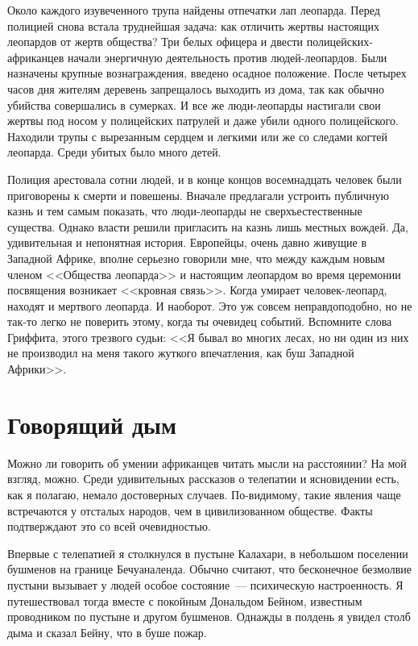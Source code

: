 \documentclass[12pt,a4paper,twoside,openany,svgnames]{memoir}
\begin{document}
Около каждого изувеченного трупа найдены отпечатки лап леопарда. Перед полицией снова встала труднейшая задача: как отличить жертвы настоящих леопардов от жертв общества? Три белых офицера и двести полицейских-африканцев начали энергичную деятельность против людей-леопардов. Были назначены крупные вознаграждения, введено осадное положение. После четырех часов дня жителям деревень запрещалось выходить из дома, так как обычно убийства совершались в сумерках. И все же люди-леопарды настигали свои жертвы под носом у полицейских патрулей и даже убили одного полицейского. Находили трупы с вырезанным сердцем и легкими или же со следами когтей леопарда. Среди убитых было много детей.

Полиция арестовала сотни людей, и в конце концов восемнадцать человек были приговорены к смерти и повешены. Вначале предлагали устроить публичную казнь и тем самым показать, что люди-леопарды не сверхъестественные существа. Однако власти решили пригласить на казнь лишь местных вождей. Да, удивительная и непонятная история. Европейцы, очень давно живущие в Западной Африке, вполне серьезно говорили мне, что между каждым новым членом <<Общества леопарда>> и настоящим леопардом во время церемонии посвящения возникает <<кровная связь>>. Когда умирает человек-леопард, находят и мертвого леопарда. И наоборот. Это уж совсем неправдоподобно, но не так-то легко не поверить этому, когда ты очевидец событий. Вспомните слова Гриффита, этого трезвого судьи: <<Я бывал во многих лесах, но ни один из них не производил на меня такого жуткого впечатления, как буш Западной Африки>>.

\chapter{Говорящий дым}

Можно ли говорить об умении африканцев читать мысли на расстоянии? На мой взгляд, можно. Среди удивительных рассказов о телепатии и ясновидении есть, как я полагаю, немало достоверных случаев. По-видимому, такие явления чаще встречаются у отсталых народов, чем в цивилизованном обществе. Факты подтверждают это со всей очевидностью.

Впервые с телепатией я столкнулся в пустыне Калахари, в небольшом поселении бушменов на границе Бечуаналенда. Обычно считают, что бесконечное безмолвие пустыни вызывает у людей особое состояние~--- психическую настроенность. Я путешествовал тогда вместе с покойным Дональдом Бейном, известным проводником по пустыне и другом бушменов. Однажды в полдень я увидел столб дыма и сказал Бейну, что в буше пожар.
\end{document}
